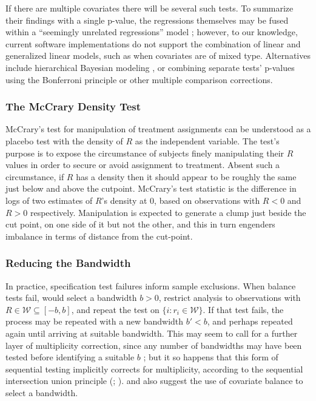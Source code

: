 If there are multiple
covariates there will be several such tests. To summarize their
findings with a single p-value, the
regressions themselves may be fused within a
``seemingly unrelated regressions'' model \citep{lee2010regression};
however, to our knowledge, current software implementations do not
support the combination of linear and generalized linear
models, such as when covariates are of mixed type.
Alternatives include hierarchical Bayesian modeling
\citep{liMatteiMealli2015BayesianRD}, or combining
separate tests' p-values using the Bonferroni principle or
other multiple comparison corrections.

\subsubsection{The McCrary Density Test}\label{sec:mccrary}
McCrary's test for manipulation of treatment assignments
\citeyearpar{mccrary2008manipulation} can be understood as a %
placebo test with the density of $R$ as the independent variable.
The test's
purpose is to expose the circumstance of subjects finely manipulating their
$R$ values in order to secure or avoid assignment to treatment.  Absent
such a circumstance, if $R$ has a density then it should appear to be
roughly the same just below and above the cutpoint.  McCrary's
\citeyearpar{mccrary2008manipulation} test statistic is the difference
in logs of two estimates of $R$'s density at 0, based on observations
with $R<0$ and $R>0$ respectively.
Manipulation is expected to generate a clump just beside the cut
point, on one side of it but not the other, and this in turn engenders
imbalance in terms of distance from the cut-point.

\subsubsection{Reducing the Bandwidth}\label{sec:bandwidth}
In practice, specification test failures inform sample exclusions.
When balance tests fail,
\citet{lee2010regression} would select a bandwidth $b>0$, restrict
analysis to observations with $R\in \mathcal{W} \subseteq [-b, b]$,
and repeat the test on $\{i : r_{i} \in \mathcal{W}\}$.
If that test fails, the process may be repeated with a new bandwidth
$b'<b$, and perhaps repeated again until arriving at suitable bandwidth.
This may seem to call for a further layer of multiplicity correction,
since any number of
bandwidths may have been tested before identifying a suitable
$b$%
; but it so happens that this form
of sequential testing implicitly corrects for multiplicity, according to the
sequential intersection union principle
(\citealp[SIUP;][Proposition~1]{rosenbaum2008testing};
\citealp{hansenSales2015cochran}).
\citet{liMatteiMealli2015BayesianRD} and
\citet{cattaneo2014randomization} also suggest the use of covariate
balance to select a bandwidth.

